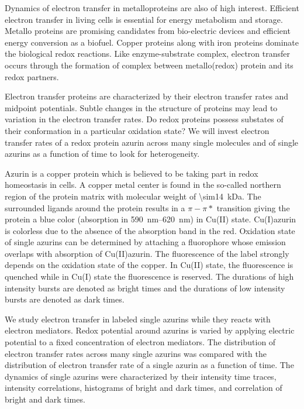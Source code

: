 Dynamics of electron transfer in metalloproteins are also of high interest.\cite{marcus1985electron,dooley1981spectroscopic} Efficient electron transfer in living cells is essential for energy metabolism and storage. Metallo proteins are promising candidates from bio-electric devices and efficient energy conversion as a biofuel. Copper proteins along with iron proteins dominate the biological redox reactions. \cite{solomon2004electronic,solomon2001oxygen,peisach1974structural,canters1993engineering} 
Like enzyme-substrate complex, electron transfer occurs through the formation of complex between metallo(redox) protein and its redox partners. 

Electron transfer proteins are characterized by their electron transfer rates and midpoint potentials. Subtle changes in the structure of proteins may lead to variation in the electron transfer rates. Do redox proteins possess substates of their conformation in a particular oxidation state? We will invest electron transfer rates of a redox protein azurin across many single molecules and of single azurins as a function of time to look for heterogeneity.

Azurin is a copper protein which is believed to be taking part in redox homeostasis in cells. A copper metal center is found in the so-called northern region of the protein matrix with molecular weight of \SI{\sim14}{\kilo\dalton}. The surrounded ligands around the protein results in a $\pi-\pi*$ transition giving the protein a blue color (absorption in \SIrange{590}{620}{\nm}) in Cu(II) state. Cu(I)azurin is colorless due to the absence of the absorption band in the red. Oxidation state of single azurins can be determined by attaching a fluorophore whose emission overlaps with absorption of Cu(II)azurin.\cite{kuznetsova2006a,kuznetsova2008the}
The fluorescence of the label strongly depends on the oxidation state of the copper. In Cu(II) state, the fluorescence is quenched while in Cu(I) state the fluorescence is reserved. The durations of high intensity bursts are denoted as bright times and the durations of low intensity bursts are denoted as dark times.

We study electron transfer in labeled single azurins while they reacts with electron mediators. Redox potential around azurins is varied by applying electric potential to a fixed concentration of electron mediators. The distribution of electron transfer rates across many single azurins was compared with the distribution of electron transfer rate of a single azurin as a function of time. The dynamics of single azurins were characterized by their intensity time traces, intensity correlations, histograms of bright and dark times, and correlation of bright and dark times.

